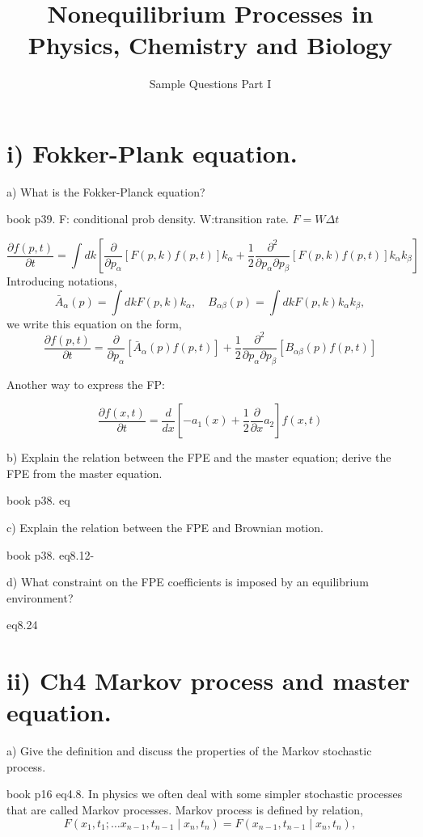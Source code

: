 \documentclass[UTF8]{ctexart}
\title{Nonequilibrium Processes in Physics, Chemistry and Biology }
\author{Sample Questions Part I}
\date{}
\begin{document}
\maketitle


\section{i) Fokker-Plank equation. }

 a) What is the Fokker-Planck equation? 
 
book p39. 
F: conditional prob density.
W:transition rate.
$F=W\Delta t$
 
 $$
\frac{\partial f(p, t)}{\partial t}=\int d k\left[\frac{\partial}{\partial p_{\alpha}}[F(p, k) f(p, t)] k_{\alpha}+\frac{1}{2} \frac{\partial^{2}}{\partial p_{\alpha} \partial p_{\beta}}[F(p, k) f(p, t)] k_{\alpha} k_{\beta}\right]
$$
Introducing notations,
$$
\bar{A}_{\alpha}(p)=\int d k F(p, k) k_{\alpha}, \quad B_{\alpha \beta}(p)=\int d k F(p, k) k_{\alpha} k_{\beta},
$$
we write this equation on the form,
$$
\frac{\partial f(p, t)}{\partial t}=\frac{\partial}{\partial p_{\alpha}}\left[\bar{A}_{\alpha}(p) f(p, t)\right]+\frac{1}{2} \frac{\partial^{2}}{\partial p_{\alpha} \partial p_{\beta}}\left[B_{\alpha \beta}(p) f(p, t)\right]
$$
 
 Another way to express the FP:
 
 $$\frac{\partial f(x, t)}{\partial t} =  \frac{d}{dx}[-a_{1}(x) +\frac{1}{2}\frac{\partial}{\partial x }a_{2}]f(x,t)$$
 
 
 b) Explain the relation between the FPE and the master equation; derive the FPE from the master equation. 
 
  book p38. eq
 
 c) Explain the relation between the FPE and Brownian motion. 
 
 book p38. eq8.12-
 
 
 
 d) What constraint on the FPE coefficients is imposed by an equilibrium environment?
 
 eq8.24


\section{ii) Ch4 Markov process and master equation.}

a) Give the definition and discuss the properties of the Markov stochastic process.

book p16 eq4.8. 
In physics we often deal with some simpler stochastic processes that are called Markov processes. Markov process is defined by relation,
$$
F\left(x_{1}, t_{1} ; \ldots x_{n-1}, t_{n-1} \mid x_{n}, t_{n}\right)=F\left(x_{n-1}, t_{n-1} \mid x_{n}, t_{n}\right),
$$
\end{document}
